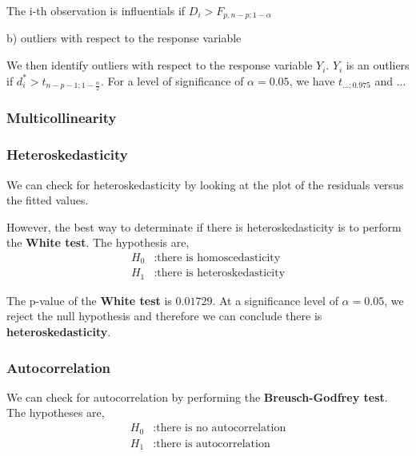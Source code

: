 The i-th observation is influentials if $D_i > F_{p,n-p;1-\alpha}$


b) outliers with respect to the response variable

We then identify outliers with respect to the response variable $Y_i$. $Y_i$ is an outliers if $d_i^{\ast} > t_{n-p-1;1 - \frac{\alpha}{2}}$. For a level of significance of $\alpha = 0.05$, we have $t_{... ; 0.975}$ and ... 


\subsubsection{Multicollinearity}


\subsubsection{Heteroskedasticity}

We can check for heteroskedasticity by looking at the plot of the residuals versus the fitted values.


However, the best way to determinate if there is heteroskedasticity is to perform the \textbf{White test}. The hypothesis are,
\begin{align*}
	H_0&: \text{there is homoscedasticity} \\
	H_1&: \text{there is heteroskedasticity}
\end{align*}


The p-value of the \textbf{White test} is $0.01729$. At a significance level of $\alpha = 0.05$, we reject the null hypothesis and therefore we can conclude there is \textbf{heteroskedasticity}.


\subsubsection{Autocorrelation}

We can check for autocorrelation by performing the \textbf{Breusch-Godfrey test}. The hypotheses are,
\begin{align*}
	H_0&: \text{there is no autocorrelation} \\
	H_1&: \text{there is autocorrelation}
\end{align*}

